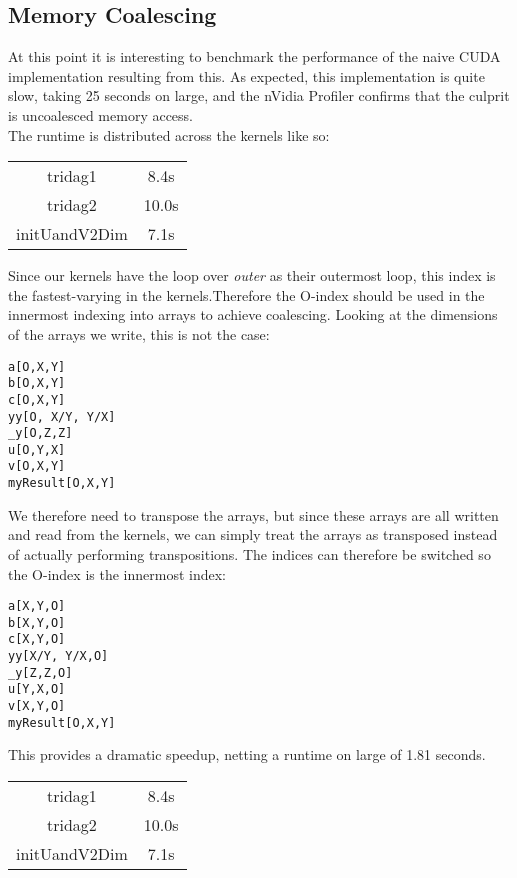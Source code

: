\subsection{Memory Coalescing}
At this point it is interesting to benchmark the performance of the naive CUDA implementation resulting from this. As expected, this implementation is quite slow, taking 25 seconds on large, and the nVidia Profiler confirms that the culprit is uncoalesced memory access.\\
The runtime is distributed across the kernels like so: \\
\begin{tabular}{c|c}
    tridag1 & 8.4s \\
    tridag2 & 10.0s \\
    initUandV2Dim & 7.1s
\end{tabular}
\par Since our kernels have the loop over \emph{outer} as their outermost loop, this index is the fastest-varying in the kernels.Therefore the O-index should be used in the innermost indexing into arrays to achieve coalescing. Looking at the dimensions of the arrays we write, this is not the case: 
\begin{verbatim}
a[O,X,Y]
b[O,X,Y]
c[O,X,Y]
yy[O, X/Y, Y/X]
_y[O,Z,Z]
u[O,Y,X]
v[O,X,Y]
myResult[O,X,Y]
\end{verbatim}

We therefore need to transpose the arrays, but since these arrays are all written and read from the kernels, we can simply treat the arrays as transposed instead of actually performing transpositions. The indices can therefore be switched so the O-index is the innermost index: 

\begin{verbatim}
a[X,Y,O]
b[X,Y,O]
c[X,Y,O]
yy[X/Y, Y/X,O]
_y[Z,Z,O]
u[Y,X,O]
v[X,Y,O]
myResult[O,X,Y]
\end{verbatim}

This provides a dramatic speedup, netting a runtime on large of 1.81 seconds.
\begin{tabular}{c|c}
    tridag1 & 8.4s \\
    tridag2 & 10.0s \\
    initUandV2Dim & 7.1s
\end{tabular}
